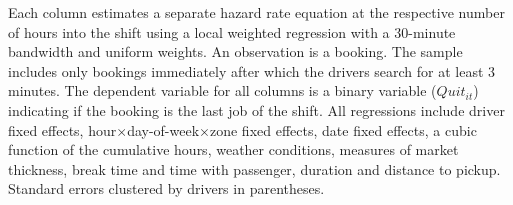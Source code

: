 \documentclass[reviewmode,AEJ]{AEA}
\begin{document}
\begin{table}[]
	\begin{tablenotes}
		\small
        Each column estimates a separate hazard rate equation at the respective number of hours into the shift using a local weighted regression with a 30-minute bandwidth and uniform weights. An observation is a booking. The sample includes only bookings immediately after which the drivers search for at least 3 minutes. The dependent variable for all columns is a binary variable ($Quit_{it}$) indicating if the booking is the last job of the shift. All regressions include driver fixed effects, hour\(\times\)day-of-week\(\times\)zone fixed effects, date fixed effects, a cubic function of the cumulative hours, weather conditions, measures of market thickness, break time and time with passenger, duration and distance to pickup. Standard errors clustered by drivers in parentheses.%
	\end{tablenotes}
\end{table}
\end{document}
